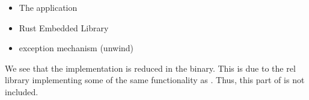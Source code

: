 \begin{itemize}
\item The application
\item Rust Embedded Library
\item {\rust} exception mechanism (unwind)
\end{itemize}

We see that the  implementation is reduced in the {\rust} binary.
This is due to the \gls{rel} library implementing some of the same functionality as .
Thus, this part of  is not included.





